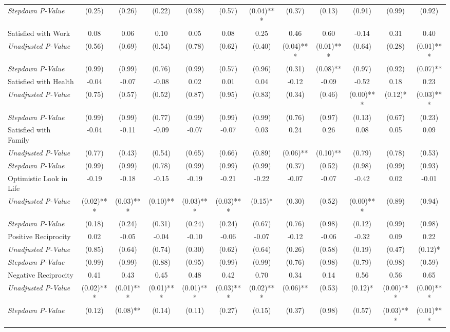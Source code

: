 \begin{tabular}{l c c c c c c c c c c c}
\quad \textit{Stepdown P-Value} & (0.25) & (0.26) & (0.22) & (0.98) & (0.57) & (0.04)*** & (0.37) & (0.13) & (0.91) & (0.99) & (0.92) \\
Satisfied with Work & 0.08 & 0.06 & 0.10 & 0.05 & 0.08 & 0.25 & 0.46 & 0.60 & -0.14 & 0.31 & 0.40 \\
\quad \textit{Unadjusted P-Value} & (0.56) & (0.69) & (0.54) & (0.78) & (0.62) & (0.40) & (0.04)*** & (0.01)*** & (0.64) & (0.28) & (0.01)*** \\
\quad \textit{Stepdown P-Value} & (0.99) & (0.99) & (0.76) & (0.99) & (0.57) & (0.96) & (0.31) & (0.08)** & (0.97) & (0.92) & (0.07)** \\
Satisfied with Health & -0.04 & -0.07 & -0.08 & 0.02 & 0.01 & 0.04 & -0.12 & -0.09 & -0.52 & 0.18 & 0.23 \\
\quad \textit{Unadjusted P-Value} & (0.75) & (0.57) & (0.52) & (0.87) & (0.95) & (0.83) & (0.34) & (0.46) & (0.00)*** & (0.12)* & (0.03)*** \\
\quad \textit{Stepdown P-Value} & (0.99) & (0.99) & (0.77) & (0.99) & (0.99) & (0.99) & (0.76) & (0.97) & (0.13) & (0.67) & (0.23) \\
Satisfied with Family & -0.04 & -0.11 & -0.09 & -0.07 & -0.07 & 0.03 & 0.24 & 0.26 & 0.08 & 0.05 & 0.09 \\
\quad \textit{Unadjusted P-Value} & (0.77) & (0.43) & (0.54) & (0.65) & (0.66) & (0.89) & (0.06)** & (0.10)** & (0.79) & (0.78) & (0.53) \\
\quad \textit{Stepdown P-Value} & (0.99) & (0.99) & (0.78) & (0.99) & (0.99) & (0.99) & (0.37) & (0.52) & (0.98) & (0.99) & (0.93) \\
Optimistic Look in Life & -0.19 & -0.18 & -0.15 & -0.19 & -0.21 & -0.22 & -0.07 & -0.07 & -0.42 & 0.02 & -0.01 \\
\quad \textit{Unadjusted P-Value} & (0.02)*** & (0.03)*** & (0.10)** & (0.03)*** & (0.03)*** & (0.15)* & (0.30) & (0.52) & (0.00)*** & (0.89) & (0.94) \\
\quad \textit{Stepdown P-Value} & (0.18) & (0.24) & (0.31) & (0.24) & (0.24) & (0.67) & (0.76) & (0.98) & (0.12) & (0.99) & (0.98) \\
Positive Reciprocity & 0.02 & -0.05 & -0.04 & -0.10 & -0.06 & -0.07 & -0.12 & -0.06 & -0.32 & 0.09 & 0.22 \\
\quad \textit{Unadjusted P-Value} & (0.85) & (0.64) & (0.74) & (0.30) & (0.62) & (0.64) & (0.26) & (0.58) & (0.19) & (0.47) & (0.12)* \\
\quad \textit{Stepdown P-Value} & (0.99) & (0.99) & (0.88) & (0.95) & (0.99) & (0.99) & (0.76) & (0.98) & (0.79) & (0.98) & (0.59) \\
Negative Reciprocity & 0.41 & 0.43 & 0.45 & 0.48 & 0.42 & 0.70 & 0.34 & 0.14 & 0.56 & 0.56 & 0.65 \\
\quad \textit{Unadjusted P-Value} & (0.02)*** & (0.01)*** & (0.01)*** & (0.01)*** & (0.03)*** & (0.02)*** & (0.06)** & (0.53) & (0.12)* & (0.00)*** & (0.00)*** \\
\quad \textit{Stepdown P-Value} & (0.12) & (0.08)** & (0.14) & (0.11) & (0.27) & (0.15) & (0.37) & (0.98) & (0.57) & (0.03)*** & (0.01)*** \\
\bottomrule
\end{tabular}
